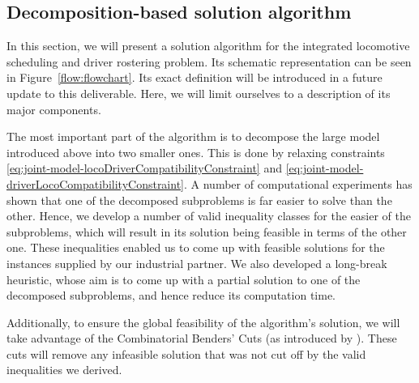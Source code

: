 \subsection{Decomposition-based solution algorithm}
In this section, we will present a solution algorithm for the integrated locomotive scheduling and driver rostering problem. Its schematic representation can be seen in Figure~\ref{flow:flowchart}. Its exact definition will be introduced in a future update to this deliverable. Here, we will limit ourselves to a description of its major components. 

The most important part of the algorithm is to decompose the large model introduced above into two smaller ones. This is done by relaxing constraints \ref{eq:joint-model-locoDriverCompatibilityConstraint} and \eqref{eq:joint-model-driverLocoCompatibilityConstraint}. A number of computational experiments has shown that one of the decomposed subproblems is far easier to solve than the other. Hence, we develop a number of valid inequality classes for the easier of the subproblems, which will result in its solution being feasible in terms of the other one. These inequalities enabled us to come up with feasible solutions for the instances supplied by our industrial partner. We also developed a long-break heuristic, whose aim is to come up with a partial solution to one of the decomposed subproblems, and hence reduce its computation time. 

Additionally, to ensure the global feasibility of the algorithm's solution, we will take advantage of the Combinatorial Benders' Cuts (as introduced by \cite{codato_combinatorial_2006}). These cuts will remove any infeasible solution that was not cut off by the valid inequalities we derived.


